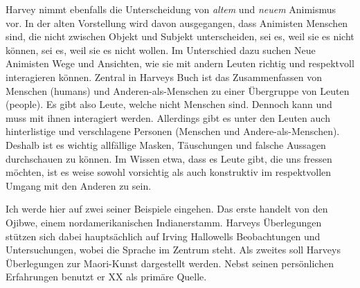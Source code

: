 Harvey nimmt ebenfalls die Unterscheidung von \emph{altem} und \emph{neuem} Animismus vor. In der alten Vorstellung wird davon ausgegangen, dass Animisten Menschen sind, die nicht zwischen Objekt und Subjekt unterscheiden, sei es, weil sie es nicht können, sei es, weil sie es nicht wollen. Im Unterschied dazu suchen Neue Animisten Wege und Ansichten, wie sie mit andern Leuten richtig und respektvoll interagieren können. Zentral in Harveys Buch ist das Zusammenfassen von Menschen (humans) und Anderen-als-Menschen zu einer Übergruppe von Leuten (people). Es gibt also Leute, welche nicht Menschen sind. Dennoch kann und muss mit ihnen interagiert werden. Allerdings gibt es unter den Leuten auch hinterlistige und verschlagene Personen (Menschen und Andere-als-Menschen). Deshalb ist es wichtig allfällige Masken, Täuschungen und falsche Aussagen durchschauen zu können. Im Wissen etwa, dass es Leute gibt, die uns fressen möchten, ist es weise sowohl vorsichtig als auch konstruktiv im respektvollen Umgang mit den Anderen zu sein. 

Ich werde hier auf zwei seiner Beispiele eingehen. Das erste handelt von den Ojibwe, einem nordamerikanischen Indianerstamm. Harveys Überlegungen stützen sich dabei hauptsächlich auf Irving Hallowells Beobachtungen und Untersuchungen, wobei die Sprache im Zentrum steht. Als zweites soll Harveys Überlegungen zur Maori-Kunst dargestellt werden. Nebst seinen persönlichen Erfahrungen benutzt er XX als primäre Quelle. 

